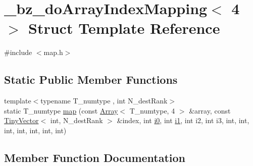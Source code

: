 \hypertarget{struct__bz__doArrayIndexMapping_3_014_01_4}{}\section{\+\_\+bz\+\_\+do\+Array\+Index\+Mapping$<$ 4 $>$ Struct Template Reference}
\label{struct__bz__doArrayIndexMapping_3_014_01_4}


{\ttfamily \#include $<$map.\+h$>$}

\subsection*{Static Public Member Functions}
\begin{DoxyCompactItemize}
\item 
{\footnotesize template$<$typename T\+\_\+numtype , int N\+\_\+dest\+Rank$>$ }\\static T\+\_\+numtype \hyperlink{struct__bz__doArrayIndexMapping_3_014_01_4_a2721cc50c1d629a687a7e9169bacc0af}{map} (const \hyperlink{classArray}{Array}$<$ T\+\_\+numtype, 4 $>$ \&array, const \hyperlink{classTinyVector}{Tiny\+Vector}$<$ int, N\+\_\+dest\+Rank $>$ \&index, int \hyperlink{cephes_8h_aacd2643d920288e61be16787561a4514}{i0}, int \hyperlink{cephes_8h_ab24474d03df1f9adf1700c2c1badd1a5}{i1}, int i2, int i3, int, int, int, int, int, int, int)
\end{DoxyCompactItemize}


\subsection{Member Function Documentation}
\hypertarget{struct__bz__doArrayIndexMapping_3_014_01_4_a2721cc50c1d629a687a7e9169bacc0af}{}
